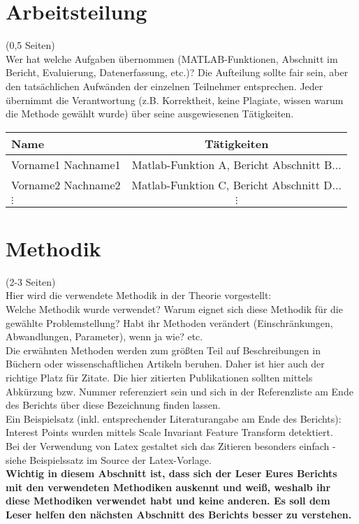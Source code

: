 \documentclass[paper=A4, deutsch]{scrartcl}
\begin{document}
\section{Arbeitsteilung}
(0,5 Seiten)\\
Wer hat welche Aufgaben übernommen (MATLAB-Funktionen, Abschnitt im Bericht, Evaluierung, Datenerfassung, etc.)? Die Aufteilung sollte fair sein, aber den tatsächlichen Aufwänden der einzelnen Teilnehmer entsprechen. Jeder übernimmt die Verantwortung (z.B. Korrektheit, keine Plagiate, wissen warum die Methode gewählt wurde) über seine ausgewiesenen Tätigkeiten.

\begin{center}
  \begin{tabular}{ |l | c | }
    \hline
  Name & Tätigkeiten\\
    \hline
		Vorname1 Nachname1 & Matlab-Funktion A, Bericht Abschnitt B...\\
		\hline
		Vorname2 Nachname2 & Matlab-Funktion C, Bericht Abschnitt D...\\
		\hline
		$\vdots$ & $\vdots$\\
  \end{tabular}
\end{center}


\section{Methodik}
(2-3 Seiten)\\
Hier wird die verwendete Methodik in der Theorie vorgestellt:\\
Welche Methodik wurde verwendet? Warum eignet sich diese Methodik für die gewählte Problemstellung? Habt ihr Methoden verändert (Einschränkungen, Abwandlungen, Parameter), wenn ja wie? etc.\\
Die erwähnten Methoden werden zum größten Teil auf Beschreibungen in Büchern oder wissenschaftlichen Artikeln beruhen. Daher ist hier auch der richtige Platz für Zitate. Die hier zitierten Publikationen sollten mittels Abkürzung bzw. Nummer referenziert sein und sich in der Referenzliste am Ende des Berichts über diese Bezeichnung finden lassen.\\
Ein Beispielsatz (inkl. entsprechender Literaturangabe am Ende des Berichts): Interest Points wurden mittels Scale Invariant Feature Transform \cite{lowe2004} detektiert.\\
Bei der Verwendung von Latex gestaltet sich das Zitieren besonders einfach - siehe Beispielssatz im Source der Latex-Vorlage.\\
\textbf{Wichtig in diesem Abschnitt ist, dass sich der Leser Eures Berichts mit den verwendeten Methodiken auskennt und weiß, weshalb ihr diese Methodiken verwendet habt und keine anderen. Es soll dem Leser helfen den nächsten Abschnitt des Berichts besser zu verstehen.}
\end{document}
